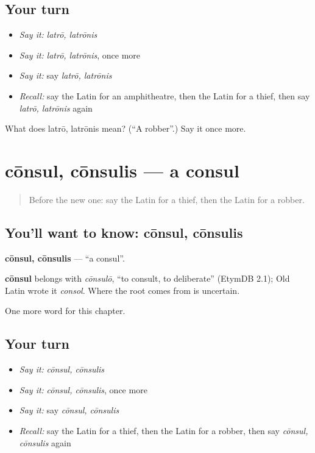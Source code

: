 \subsection*{Your turn}
\begin{itemize}
\raggedright
  \item \emph{Say it:} \emph{latrō, latrōnis}
  \item \emph{Say it:} \emph{latrō, latrōnis}, once more
  \item \emph{Say it:} say \emph{latrō, latrōnis}
  \item \emph{Recall:} say the Latin for an amphitheatre, then the Latin for a thief, then say \emph{latrō, latrōnis} again
\end{itemize}

\begin{tcolorbox}[breakable,colback=teal!4,colframe=teal!35!black,title={Before you move on}]
What does latrō, latrōnis mean? (\textquotedblleft{}A robber\textquotedblright{}.) Say it once more.
\end{tcolorbox}
\section[cōnsul, cōnsulis]{cōnsul, cōnsulis — a consul}

\label{lesson:LA-C245-consul}



\begin{quote}
Before the new one: say the Latin for a thief, then the Latin for a robber.
\end{quote}

\subsection*{You'll want to know: cōnsul, cōnsulis}
\textbf{cōnsul, cōnsulis} — \textquotedblleft{}a consul\textquotedblright{}.

\begin{cousinweb}
\textbf{cōnsul} belongs with \emph{cōnsulō}, \textquotedblleft{}to consult, to deliberate\textquotedblright{} (EtymDB 2.1); Old Latin wrote it \emph{consol}. Where the root comes from is uncertain.
\end{cousinweb}

\begin{grammarlens}[title={What you've built}]
One more word for this chapter.
\end{grammarlens}

\subsection*{Your turn}
\begin{itemize}
\raggedright
  \item \emph{Say it:} \emph{cōnsul, cōnsulis}
  \item \emph{Say it:} \emph{cōnsul, cōnsulis}, once more
  \item \emph{Say it:} say \emph{cōnsul, cōnsulis}
  \item \emph{Recall:} say the Latin for a thief, then the Latin for a robber, then say \emph{cōnsul, cōnsulis} again
\end{itemize}

